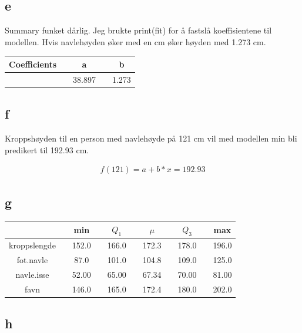 \subsection*{e}
Summary funket dårlig. Jeg brukte print(fit) for å fastslå koeffisientene til modellen. Hvis navlehøyden øker med en cm øker høyden med 1.273 cm.

\begin{center}
\label{tab:e}
\begin{tabularx}{\textwidth}{c X c X c }
    \hline
    \hline
        Coefficients && a && b\\
    \hline
				   	&& 38.897 && 1.273\\
    \hline
\end{tabularx}
\end{center}

\subsection*{f}
Kroppshøyden til en person med navlehøyde på 121 cm vil med modellen min bli predikert til 192.93 cm. 

\begin{align*}
	f(121)= a + b*x = 192.93
\end{align*}

\pagebreak
\subsection*{g}

\begin{center}
\label{tab:summary2}
\begin{tabularx}{\textwidth}{c X c X c X c X c X c }
    \hline
    \hline
         && min && $Q_1$ && $\mu$ && $Q_3$ && max \\
    \hline
    kroppslengde   	&& 152.0 && 166.0 && 172.3 && 178.0 && 196.0 \\
    fot.navle    	&&  87.0 && 101.0 && 104.8 && 109.0 && 125.0 \\
    navle.isse	 	&& 52.00 && 65.00 && 67.34 && 70.00 && 81.00 \\
    favn			&& 146.0 && 165.0 && 172.4 && 180.0 && 202.0 \\

    \hline
\end{tabularx}
\end{center}


\subsection*{h}

